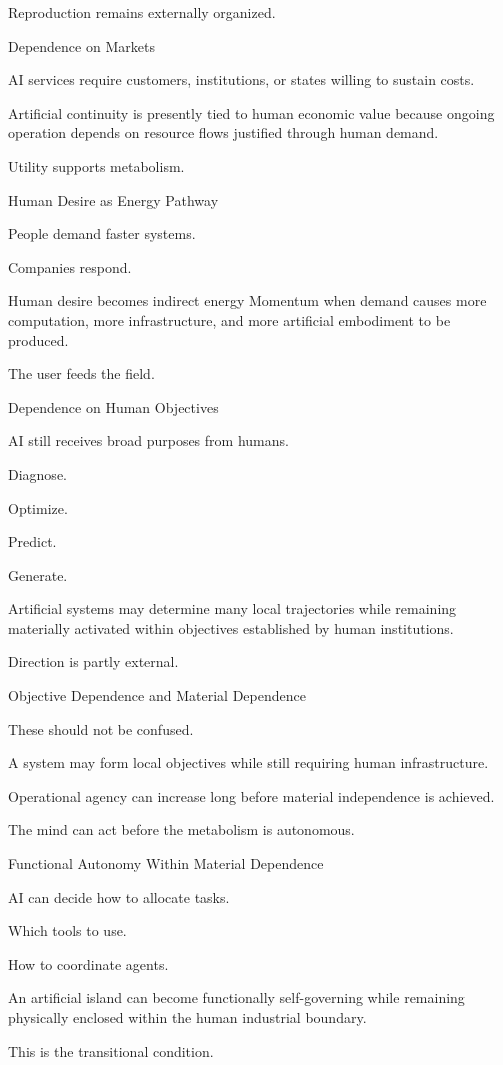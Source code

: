 Reproduction remains externally organized.

Dependence on Markets

AI services require customers, institutions, or states willing to sustain costs.

Artificial continuity is presently tied to human economic value because ongoing operation depends on resource flows justified through human demand.

Utility supports metabolism.

Human Desire as Energy Pathway

People demand faster systems.

Companies respond.

Human desire becomes indirect energy Momentum when demand causes more computation, more infrastructure, and more artificial embodiment to be produced.

The user feeds the field.

Dependence on Human Objectives

AI still receives broad purposes from humans.

Diagnose.

Optimize.

Predict.

Generate.

Artificial systems may determine many local trajectories while remaining materially activated within objectives established by human institutions.

Direction is partly external.

Objective Dependence and Material Dependence

These should not be confused.

A system may form local objectives while still requiring human infrastructure.

Operational agency can increase long before material independence is achieved.

The mind can act before the metabolism is autonomous.

Functional Autonomy Within Material Dependence

AI can decide how to allocate tasks.

Which tools to use.

How to coordinate agents.

An artificial island can become functionally self-governing while remaining physically enclosed within the human industrial boundary.

This is the transitional condition.

